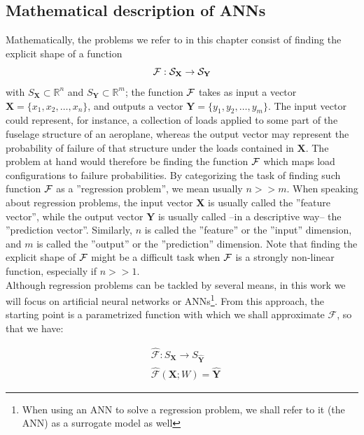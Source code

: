 \subsection{Mathematical description of ANNs}
\indent Mathematically, the problems we refer to in this chapter consist of finding the explicit shape of a function
\begin{equation}\label{eq:F}
	\cal{F}:S_{\mathbf{X}}\rightarrow S_{\mathbf{Y}}
\end{equation}
with $S_{\mathbf{X}}\subset\mathbb{R}^n$ and $S_{\mathbf{Y}}\subset\mathbb{R}^m$; \ie the function $\cal{F}$ takes as input a vector $\mathbf{X}=\{x_1,x_2,\ldots,x_n\}$, and outputs a vector $\mathbf{Y}=\{y_1,y_2,\ldots,y_m\}$. The input vector could represent, for instance, a collection of loads applied to some part of the fuselage structure of an aeroplane, whereas the output vector may represent the probability of failure of that structure under the loads contained in $\mathbf{X}$. The problem at hand would therefore be finding the function $\cal{F}$ which maps load configurations to failure probabilities. By categorizing the task of finding such function $\cal{F}$ as a ''regression problem'', we mean usually $n>>m$. When speaking about regression problems, the input vector $\mathbf{X}$ is usually called the ''feature vector'', while the output vector $\mathbf{Y}$ is usually called --in a descriptive way-- the ''prediction vector''. Similarly, $n$ is called the ''feature'' or the ''input'' dimension, and $m$ is called the ''output'' or the ''prediction'' dimension. Note that finding the explicit shape of $\cal{F}$ might be a difficult task when $\cal{F}$ is a strongly non-linear function, especially if $n>>1$.\\
%
\indent Although regression problems can be tackled by several means, in this work we will focus on artificial neural networks or ANNs\cite{Marsland2015Machine}\footnote{When using an ANN to solve a regression problem, we shall refer to it (the ANN) as a surrogate model as well}. From this approach, the starting point is a parametrized function with which we shall approximate $\mathcal{F}$, so that we have:

\begin{align}
	& \hat{\mathcal{F}} : S_{\mathbf{X}} \rightarrow S_{\mathbf{\hat{Y}}} \\
	& \hat{\mathcal{F}}(\mathbf{X}; W) = \mathbf{\hat{Y}} \label{eq:Fhat}
\end{align}

